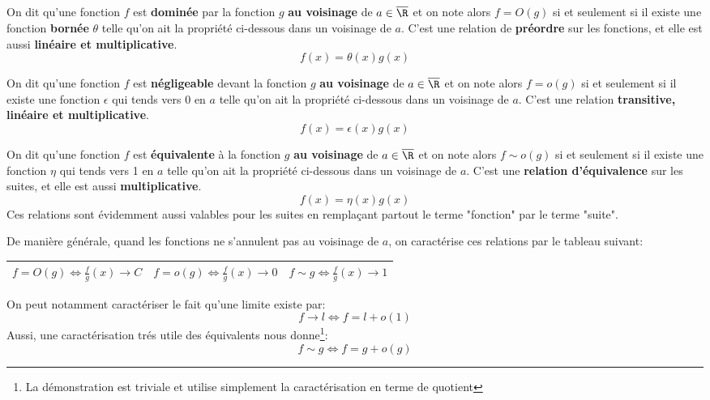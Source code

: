 \subsection*{}

On dit qu'une fonction \(f\) est \textbf{dominée} par la fonction \(g\) \textbf{au voisinage} de \(a \in \overline{\R}\) et on note alors \(f = O(g)\) si et seulement si il existe une fonction \textbf{bornée} \(\theta\) telle qu'on ait la propriété ci-dessous dans un voisinage de \(a\).\+
C'est une relation de \textbf{préordre} sur les fonctions, et elle est aussi \textbf{linéaire et multiplicative}.
\[
   f(x) = \theta(x)g(x)
\]

On dit qu'une fonction \(f\) est \textbf{négligeable} devant la fonction \(g\) \textbf{au voisinage} de \(a \in \overline{\R}\) et on note alors \(f = o(g)\) si et seulement si il existe une fonction \(\epsilon\) qui tends vers 0 en \(a\) telle qu'on ait la propriété ci-dessous dans un voisinage de \(a\).\+
C'est une relation \textbf{transitive, linéaire et multiplicative}.
\[
   f(x) = \epsilon(x)g(x)
\]

On dit qu'une fonction \(f\) est \textbf{équivalente} à la fonction \(g\) \textbf{au voisinage} de \(a \in \overline{\R}\) et on note alors \(f \sim o(g)\) si et seulement si il existe une fonction \(\eta\) qui tends vers 1 en \(a\) telle qu'on ait la propriété ci-dessous dans un voisinage de \(a\).\+
C'est une \textbf{relation d'équivalence} sur les suites, et elle est aussi \textbf{multiplicative}. 
\[
   f(x) = \eta(x)g(x)
\]
Ces relations sont évidemment aussi valables pour les suites en remplaçant partout le terme "fonction" par le terme "suite".
\pagebreak

De manière générale, quand les fonctions ne s'annulent pas au voisinage de \(a\), on caractérise ces relations par le tableau suivant:
\begin{center}
   \renewcommand{\arraystretch}{1.5}%
   \setlength\arrayrulewidth{0.8pt}
   \begin{tabular}{| c | c | c |}
   \hline
   \(f = O(g) \Longleftrightarrow \frac{f}{g}(x) \longrightarrow C\) &    \(f = o(g) \Longleftrightarrow \frac{f}{g}(x) \longrightarrow 0\) &    \(f \sim g \Longleftrightarrow \frac{f}{g}(x) \longrightarrow 1\)\\ [1.5ex]
   \hline
   \end{tabular}
\end{center}  

On peut notamment caractériser le fait qu'une limite existe par:
\[
   f \longrightarrow l \Longleftrightarrow f = l + o(1)
\]   
Aussi, une caractérisation trés utile des équivalents nous donne\footnote[1]{La démonstration est triviale et utilise simplement la caractérisation en terme de quotient}:
\[
   f \sim g \Longleftrightarrow f = g + o(g)
\]

